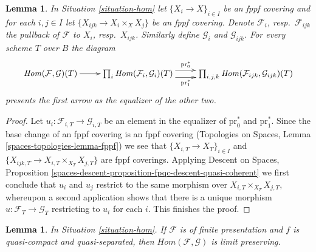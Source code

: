\documentclass{stacks-project}
\theoremstyle{plain}
\newtheorem{lemma}[subsection]{Lemma}
\theoremstyle{definition}
\theoremstyle{remark}
\numberwithin{equation}{subsection}
\begin{document}
\begin{lemma}
\label{lemma-hom-sheaf-in-X}
In Situation \ref{situation-hom} let $\{X_i \to X\}_{i \in I}$ be an fppf
covering and for each $i, j \in I$ let $\{X_{ijk} \to X_i \times_X X_j\}$
be an fppf covering. Denote $\mathcal{F}_i$, resp.\ $\mathcal{F}_{ijk}$
the pullback of $\mathcal{F}$ to $X_i$, resp.\ $X_{ijk}$. Similarly
define $\mathcal{G}_i$ and $\mathcal{G}_{ijk}$. For every scheme
$T$ over $B$ the diagram
$$
\xymatrix{
\mathit{Hom}(\mathcal{F}, \mathcal{G})(T) \ar[r] &
\prod\nolimits_i
\mathit{Hom}(\mathcal{F}_i, \mathcal{G}_i)(T)
\ar@<1ex>[r]^-{\text{pr}_0^*} \ar@<-1ex>[r]_-{\text{pr}_1^*}
&
\prod\nolimits_{i, j, k}
\mathit{Hom}(\mathcal{F}_{ijk}, \mathcal{G}_{ijk})(T)
}
$$
presents the first arrow as the equalizer of the other two.
\end{lemma}

\begin{proof}
Let $u_i : \mathcal{F}_{i, T} \to \mathcal{G}_{i, T}$ be an element in the
equalizer of $\text{pr}_0^*$ and $\text{pr}_1^*$. Since the base change
of an fppf covering is an fppf covering
(Topologies on Spaces, Lemma \ref{spaces-topologies-lemma-fppf})
we see that $\{X_{i, T} \to X_T\}_{i \in I}$ and
$\{X_{ijk, T} \to X_{i, T} \times_{X_T} X_{j, T}\}$ are fppf coverings.
Applying Descent on Spaces, Proposition
\ref{spaces-descent-proposition-fpqc-descent-quasi-coherent}
we first conclude that $u_i$ and $u_j$ restrict to the same morphism
over $X_{i, T} \times_{X_T} X_{j, T}$, whereupon a second application
shows that there is a unique morphism $u : \mathcal{F}_T \to \mathcal{G}_T$
restricting to $u_i$ for each $i$. This finishes the proof.
\end{proof}

\begin{lemma}
\label{lemma-hom-limits}
In Situation \ref{situation-hom}. If $\mathcal{F}$ is of finite presentation
and $f$ is quasi-compact and quasi-separated, then
$\mathit{Hom}(\mathcal{F}, \mathcal{G})$ is limit preserving.
\end{lemma}
\end{document}
